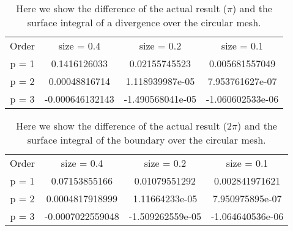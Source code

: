 \begin{table}
\caption{Here we show the difference of the actual result ($\pi$) and the surface integral of a divergence over the circular mesh.}
\centering\begin{tabular}{c | c c c}

Order & size = 0.4 & size = 0.2 & size = 0.1 \\
p = 1 & 0.1416126033 & 0.02155745523 & 0.005681557049 \\
p = 2 & 0.00048816714 & 1.118939987e-05 & 7.953761627e-07 \\
p = 3 & -0.000646132143 & -1.490568041e-05 & -1.060602533e-06 \\
\end{tabular}
\label{tbl:diffarea2}
\end{table}

\begin{table}
\caption{Here we show the difference of the actual result ($2\pi$) and the surface integral of the boundary over the circular mesh.}
\centering\begin{tabular}{c | c c c}

Order & size = 0.4 & size = 0.2 & size = 0.1 \\
p = 1 & 0.07153855166 & 0.01079551292 & 0.002841971621 \\
p = 2 & 0.0004817918999 & 1.11664233e-05 & 7.950975895e-07 \\
p = 3 & -0.0007022559048 & -1.509262559e-05 & -1.064640536e-06 \\
\end{tabular}
\label{tbl:diffperimeter}
\end{table}


